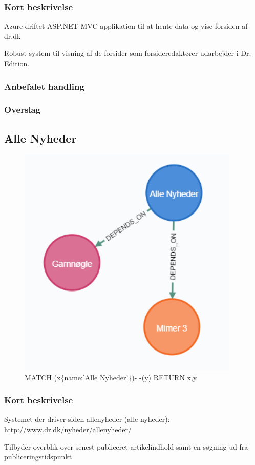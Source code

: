 \documentclass{article}
\begin{document}
\subsubsection{Kort beskrivelse}
Azure-driftet ASP.NET MVC applikation til at hente data og vise forsiden af dr.dk

Robust system til visning af de forsider som forsideredaktører udarbejder i Dr. Edition.
\subsubsection{Anbefalet handling}
\subsubsection{Overslag}


\subsection{Alle Nyheder}
\begin{figure}[h]
\includegraphics[width=300pt]{AlleNyheder.PNG}
\caption{MATCH (x\{name:'Alle Nyheder'\})- -(y) RETURN x,y}
\end{figure}
\subsubsection{Kort beskrivelse}
Systemet der driver siden allenyheder (alle nyheder): http://www.dr.dk/nyheder/allenyheder/	

Tilbyder overblik over senest publiceret artikelindhold samt en søgning ud fra publiceringstidspunkt
\end{document}

